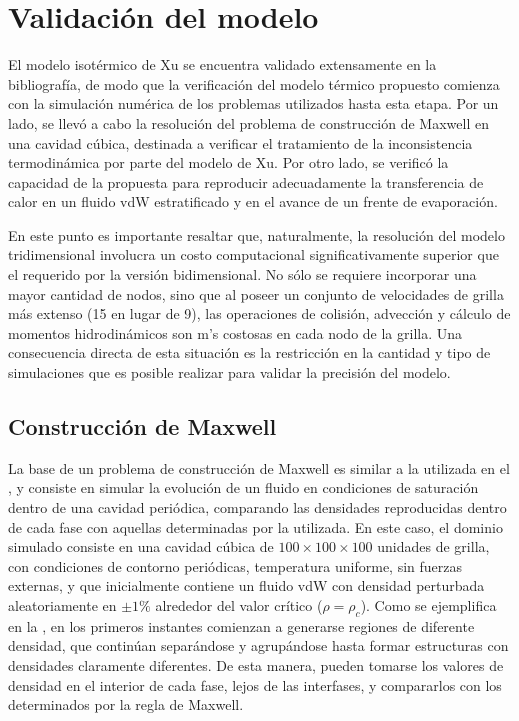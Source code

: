 \section{Validaci\'on del modelo}

El modelo isot\'ermico de Xu  se encuentra validado extensamente en la bibliograf\'ia, de modo que la verificaci\'on del modelo t\'ermico propuesto comienza con la simulaci\'on num\'erica de los problemas utilizados hasta esta etapa. Por un lado, se llev\'o a cabo la resoluci\'on del problema de construcci\'on de Maxwell en una cavidad c\'ubica, destinada a verificar el tratamiento de la inconsistencia termodin\'amica por parte del modelo de Xu. Por otro lado, se verific\'o la capacidad de la \lbe{} propuesta para reproducir adecuadamente la transferencia de calor en un fluido vdW estratificado y en el avance de un frente de evaporaci\'on.

En este punto es importante resaltar que, naturalmente, la resoluci\'on del modelo tridimensional involucra un costo computacional significativamente superior que el requerido por la versi\'on bidimensional. No s\'olo se requiere incorporar una mayor cantidad de nodos, sino que al poseer un conjunto de velocidades de grilla m\'as extenso (15 en lugar de 9), las operaciones de colisi\'on, advecci\'on y c\'alculo de momentos hidrodin\'amicos son m\a's costosas en cada nodo de la grilla. Una consecuencia directa de esta situaci\'on es la restricci\'on en la cantidad y tipo de simulaciones que es posible realizar para validar la precisi\'on del modelo. 


\subsection{Construcci\'on de Maxwell} 

La base de un problema de construcci\'on de Maxwell es similar a la utilizada en el , y consiste en simular la evoluci\'on de un fluido en condiciones de saturaci\'on dentro de una cavidad peri\'odica, comparando las densidades reproducidas dentro de cada fase con aquellas determinadas por la \eos{} utilizada. En este caso, el dominio simulado consiste en una cavidad c\'ubica de $100 \times 100 \times 100$ unidades de grilla, con condiciones de contorno peri\'odicas, temperatura uniforme, sin fuerzas externas, y que inicialmente contiene un fluido vdW con densidad perturbada aleatoriamente en  $\pm 1\%$ alrededor del valor cr\'itico ($\rho=\rho_c$). Como se ejemplifica en la , en los primeros instantes comienzan a generarse regiones de diferente densidad, que contin\'uan separ\'andose y agrup\'andose hasta formar estructuras con densidades claramente diferentes. De esta manera, pueden tomarse los valores de densidad en el interior de cada fase, lejos de las interfases, y compararlos con los determinados por la regla de Maxwell.

